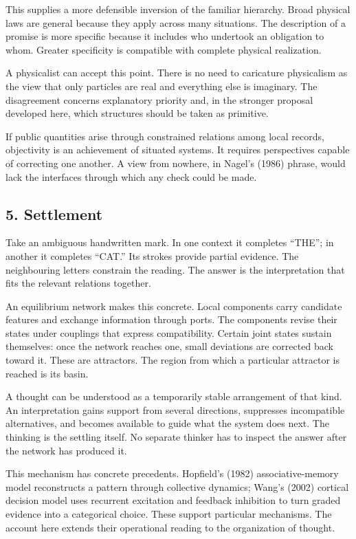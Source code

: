 \documentclass[
  11pt,
]{article}
\begin{document}
This supplies a more defensible inversion of the familiar hierarchy.
Broad physical laws are general because they apply across many
situations. The description of a promise is more specific because it
includes who undertook an obligation to whom. Greater specificity is
compatible with complete physical realization.

A physicalist can accept this point. There is no need to caricature
physicalism as the view that only particles are real and everything else
is imaginary. The disagreement concerns explanatory priority and, in the
stronger proposal developed here, which structures should be taken as
primitive.

If public quantities arise through constrained relations among local
records, objectivity is an achievement of situated systems. It requires
perspectives capable of correcting one another. A view from nowhere, in
Nagel's (1986) phrase, would lack the interfaces through which any check
could be made.

\subsection{5. Settlement}\label{settlement}

Take an ambiguous handwritten mark. In one context it completes ``THE'';
in another it completes ``CAT.'' Its strokes provide partial evidence.
The neighbouring letters constrain the reading. The answer is the
interpretation that fits the relevant relations together.

An equilibrium network makes this concrete. Local components carry
candidate features and exchange information through ports. The
components revise their states under couplings that express
compatibility. Certain joint states sustain themselves: once the network
reaches one, small deviations are corrected back toward it. These are
attractors. The region from which a particular attractor is reached is
its basin.

A thought can be understood as a temporarily stable arrangement of that
kind. An interpretation gains support from several directions,
suppresses incompatible alternatives, and becomes available to guide
what the system does next. The thinking is the settling itself. No
separate thinker has to inspect the answer after the network has
produced it.

This mechanism has concrete precedents. Hopfield's (1982)
associative-memory model reconstructs a pattern through collective
dynamics; Wang's (2002) cortical decision model uses recurrent
excitation and feedback inhibition to turn graded evidence into a
categorical choice. These support particular mechanisms. The account
here extends their operational reading to the organization of thought.
\end{document}

